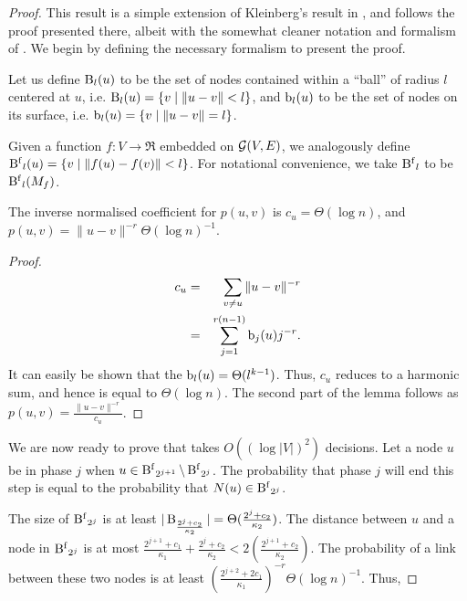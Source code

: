 \begin{proof}

This result is a simple extension of Kleinberg's result in
\cite{Kleinberg2000}, and follows the proof presented there, albeit with
the somewhat cleaner notation and formalism of \cite{Martel2004}. We
begin by defining the necessary formalism to present the proof.

\begin{definition}
Let us define $\operatorname{B}_l(u)$ to be the set of nodes contained within
a ``ball'' of radius $l$ centered at $u$, i.e.  $\operatorname{B}_l(u) = \{ v \mid
\|u - v\| < l \}$, and $\operatorname{b}_l(u)$ to be the set of nodes on its
surface, i.e. $\operatorname{b}_l(u) = \{ v \mid \|u - v\| = l \}$.

Given a function $f:V \to \Re$ embedded on $\mathcal{G}(V,E)$, we analogously
define $\operatorname{B^{f}}_l(u) = \{ v \mid \|f(u) - f(v)\| < l \}$. For notational
convenience, we take $\operatorname{B^{f}}_l$ to be $\operatorname{B^{f}}_l(M_f)$.
\end{definition}

\begin{lemma}
    The inverse normalised coefficient for $p(u,v)$ is $c_u = \Theta(
    \log n )$, and $p(u,v) = \|u - v\|^{-r} \Theta(\log n)^{-1}$.
\end{lemma}
\begin{proof}
    \begin{eqnarray*}
        c_u &=& \sum_{v \ne u} \|u - v\|^{-r} \\
            &=& \sum_{j=1}^{r(n-1)} \operatorname{b}_j(u) j^{-r}.
    \end{eqnarray*}
    It can easily be shown that the $\operatorname{b}_l(u) = \Theta( l^{k-1} )$.
    Thus, $c_u$ reduces to a harmonic sum, and hence is equal to
    $\Theta( \log n )$. The second part of the lemma follows as $p(u,v)
    = \frac{ \|u - v\|^{-r} }{c_u}$. 
\end{proof}

We are now ready to prove that \egreedyalgo takes $O( (\log |V|)^2 )$
decisions. Let a node $u$ be in phase $j$ when $u \in \operatorname{B^{f}}_{2^{j+1}}
\setminus \operatorname{B^{f}}_{2^{j}}$. The probability that phase $j$ will end this
step is equal to the probability that $N(u) \in \operatorname{B^{f}}_{2^{j}}$. 

The size of $\operatorname{B^{f}}_{2^{j}}$ is at least $|\operatorname{B}_{\frac{
2^{j}+c_2}{\kappa_2}}| = \Theta(\frac{2^{j}+c_2}{\kappa_2})$. The
distance between $u$ and a node in $\operatorname{B^{f}}_{2^{j}}$ is at most
$\frac{2^{j+1} + c_1}{ \kappa_1 } + \frac{2^{j} + c_2}{\kappa_2}
< 2(\frac{2^{j+1} + c_2}{\kappa_2})$. The probability of a link between
these two nodes is at least $(\frac{2^{j+2} + 2 c_1}{\kappa_1})^{-r}
\Theta(\log n)^{-1} $. Thus, 


\end{proof}
